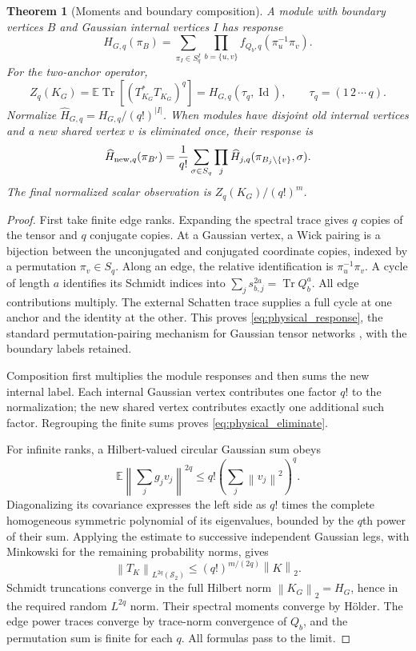 \documentclass[11pt,a4paper]{amsart}
\numberwithin{equation}{section}
\newtheorem{theorem}{Theorem}[section]
\theoremstyle{definition}
\theoremstyle{remark}
\newcommand{\E}{\mathbb E}
\newcommand{\Sch}{\mathcal S}
\DeclareMathOperator{\Id}{Id}
\DeclareMathOperator{\Tr}{Tr}
\newcommand{\norm}[1]{\left\lVert#1\right\rVert}
\begin{document}
\begin{theorem}[Moments and boundary composition]\label{thm:physicalresponse}
A module with boundary vertices $B$ and Gaussian internal vertices $I$ has response
\begin{equation}\label{eq:physical_response}
 H_{G,q}(\pi_B)=\sum_{\pi_I\in S_q^I}
                \prod_{b=\{u,v\}}f_{Q_b,q}(\pi_u^{-1}\pi_v).
\end{equation}
For the two-anchor operator,
\[
 Z_q(K_G)=\E\Tr[(T_{K_G}^*T_{K_G})^q]=H_{G,q}(\tau_q,\Id),
 \qquad\tau_q=(1\,2\,\cdots\,q).
\]
Normalize $\widehat H_{G,q}=H_{G,q}/(q!)^{|I|}$. When modules have disjoint old internal vertices and a new shared vertex $v$ is eliminated once, their response is
\begin{equation}\label{eq:physical_eliminate}
 \widehat H_{{\rm new},q}(\pi_{B'})
 =\frac1{q!}\sum_{\sigma\in S_q}
       \prod_j\widehat H_{j,q}(\pi_{B_j\setminus\{v\}},\sigma).
\end{equation}
The final normalized scalar observation is $Z_q(K_G)/(q!)^m$.
\end{theorem}
\begin{proof}
First take finite edge ranks. Expanding the spectral trace gives $q$ copies of the tensor and $q$ conjugate copies. At a Gaussian vertex, a Wick pairing is a bijection between the unconjugated and conjugated coordinate copies, indexed by a permutation $\pi_v\in S_q$. Along an edge, the relative identification is $\pi_u^{-1}\pi_v$. A cycle of length $a$ identifies its Schmidt indices into
$\sum_js_{b,j}^{2a}=\Tr Q_b^a$.
All edge contributions multiply. The external Schatten trace supplies a full cycle at one anchor and the identity at the other. This proves \eqref{eq:physical_response}, the standard permutation-pairing mechanism for Gaussian tensor networks \cite{Cheng}, with the boundary labels retained.

Composition first multiplies the module responses and then sums the new internal label. Each internal Gaussian vertex contributes one factor $q!$ to the normalization; the new shared vertex contributes exactly one additional such factor. Regrouping the finite sums proves \eqref{eq:physical_eliminate}.

For infinite ranks, a Hilbert-valued circular Gaussian sum obeys
\[
 \E\left\|\sum_jg_jv_j\right\|^{2q}
 \le q!\left(\sum_j\norm{v_j}^2\right)^q.
\]
Diagonalizing its covariance expresses the left side as $q!$ times the complete homogeneous symmetric polynomial of its eigenvalues, bounded by the $q$th power of their sum. Applying the estimate to successive independent Gaussian legs, with Minkowski for the remaining probability norms, gives
\begin{equation}\label{eq:physical_hilbert_moment}
 \norm{T_K}_{L^{2q}(\Sch_2)}\le(q!)^{m/(2q)}\norm K_2.
\end{equation}
Schmidt truncations converge in the full Hilbert norm $\norm{K_G}_2=H_G$, hence in the required random $L^{2q}$ norm. Their spectral moments converge by H\"older. The edge power traces converge by trace-norm convergence of $Q_b$, and the permutation sum is finite for each $q$. All formulas pass to the limit.
\end{proof}
\end{document}
